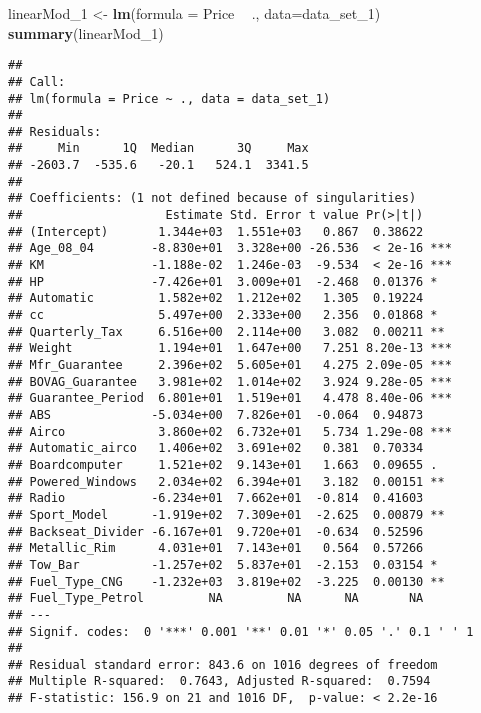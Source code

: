 \documentclass[]{article}
\newenvironment{Shaded}{\begin{snugshade}}{\end{snugshade}}
\newcommand{\DataTypeTok}[1]{\textcolor[rgb]{0.13,0.29,0.53}{#1}}
\newcommand{\DecValTok}[1]{\textcolor[rgb]{0.00,0.00,0.81}{#1}}
\newcommand{\KeywordTok}[1]{\textcolor[rgb]{0.13,0.29,0.53}{\textbf{#1}}}
\newcommand{\NormalTok}[1]{#1}
\newcommand{\OperatorTok}[1]{\textcolor[rgb]{0.81,0.36,0.00}{\textbf{#1}}}
\newcommand{\StringTok}[1]{\textcolor[rgb]{0.31,0.60,0.02}{#1}}
\begin{document}
\begin{Shaded}
\begin{Highlighting}[]
\NormalTok{linearMod_}\DecValTok{1}\NormalTok{ <-}\StringTok{ }\KeywordTok{lm}\NormalTok{(}\DataTypeTok{formula =}\NormalTok{ Price }\OperatorTok{~}\StringTok{ }\NormalTok{., }\DataTypeTok{data=}\NormalTok{data_set_}\DecValTok{1}\NormalTok{)}
\KeywordTok{summary}\NormalTok{(linearMod_}\DecValTok{1}\NormalTok{)}
\end{Highlighting}
\end{Shaded}

\begin{verbatim}
## 
## Call:
## lm(formula = Price ~ ., data = data_set_1)
## 
## Residuals:
##     Min      1Q  Median      3Q     Max 
## -2603.7  -535.6   -20.1   524.1  3341.5 
## 
## Coefficients: (1 not defined because of singularities)
##                    Estimate Std. Error t value Pr(>|t|)    
## (Intercept)       1.344e+03  1.551e+03   0.867  0.38622    
## Age_08_04        -8.830e+01  3.328e+00 -26.536  < 2e-16 ***
## KM               -1.188e-02  1.246e-03  -9.534  < 2e-16 ***
## HP               -7.426e+01  3.009e+01  -2.468  0.01376 *  
## Automatic         1.582e+02  1.212e+02   1.305  0.19224    
## cc                5.497e+00  2.333e+00   2.356  0.01868 *  
## Quarterly_Tax     6.516e+00  2.114e+00   3.082  0.00211 ** 
## Weight            1.194e+01  1.647e+00   7.251 8.20e-13 ***
## Mfr_Guarantee     2.396e+02  5.605e+01   4.275 2.09e-05 ***
## BOVAG_Guarantee   3.981e+02  1.014e+02   3.924 9.28e-05 ***
## Guarantee_Period  6.801e+01  1.519e+01   4.478 8.40e-06 ***
## ABS              -5.034e+00  7.826e+01  -0.064  0.94873    
## Airco             3.860e+02  6.732e+01   5.734 1.29e-08 ***
## Automatic_airco   1.406e+02  3.691e+02   0.381  0.70334    
## Boardcomputer     1.521e+02  9.143e+01   1.663  0.09655 .  
## Powered_Windows   2.034e+02  6.394e+01   3.182  0.00151 ** 
## Radio            -6.234e+01  7.662e+01  -0.814  0.41603    
## Sport_Model      -1.919e+02  7.309e+01  -2.625  0.00879 ** 
## Backseat_Divider -6.167e+01  9.720e+01  -0.634  0.52596    
## Metallic_Rim      4.031e+01  7.143e+01   0.564  0.57266    
## Tow_Bar          -1.257e+02  5.837e+01  -2.153  0.03154 *  
## Fuel_Type_CNG    -1.232e+03  3.819e+02  -3.225  0.00130 ** 
## Fuel_Type_Petrol         NA         NA      NA       NA    
## ---
## Signif. codes:  0 '***' 0.001 '**' 0.01 '*' 0.05 '.' 0.1 ' ' 1
## 
## Residual standard error: 843.6 on 1016 degrees of freedom
## Multiple R-squared:  0.7643, Adjusted R-squared:  0.7594 
## F-statistic: 156.9 on 21 and 1016 DF,  p-value: < 2.2e-16
\end{verbatim}
\end{document}
